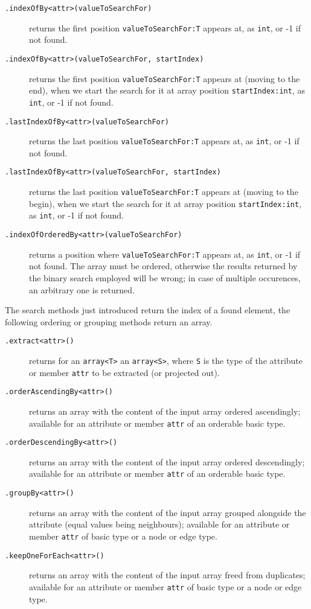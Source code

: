 \begin{description}
\item[\texttt{.indexOfBy<attr>(valueToSearchFor)}] returns the first position \texttt{valueToSearchFor:T} appears at, as \texttt{int}, or -1 if not found.
\item[\texttt{.indexOfBy<attr>(valueToSearchFor, startIndex)}] returns the first position \texttt{valueToSearchFor:T} appears at (moving to the end), when we start the search for it at array position \texttt{startIndex:int}, as \texttt{int}, or -1 if not found.
\item[\texttt{.lastIndexOfBy<attr>(valueToSearchFor)}] returns the last position \texttt{valueToSearchFor:T} appears at, as \texttt{int}, or -1 if not found.
\item[\texttt{.lastIndexOfBy<attr>(valueToSearchFor, startIndex)}] returns the last position \texttt{valueToSearchFor:T} appears at (moving to the begin), when we start the search for it at array position \texttt{startIndex:int}, as \texttt{int}, or -1 if not found.
\item[\texttt{.indexOfOrderedBy<attr>(valueToSearchFor)}] returns a position where \texttt{valueToSearchFor:T} appears at, as \texttt{int}, or -1 if not found. The array must be ordered, otherwise the results returned by the binary search employed will be wrong; in case of multiple occurences, an arbitrary one is returned.
\end{description}

\noindent The search methods just introduced return the index of a found element, the following ordering or grouping methods return an array.

\begin{description}
\item[\texttt{.extract<attr>()}] returns for an \texttt{array<T>} an \texttt{array<S>}, where \texttt{S} is the type of the attribute or member \texttt{attr} to be extracted (or projected out).
\item[\texttt{.orderAscendingBy<attr>()}] returns an array with the content of the input array ordered ascendingly; available for an attribute or member \texttt{attr} of an orderable basic type.
\item[\texttt{.orderDescendingBy<attr>()}] returns an array with the content of the input array ordered descendingly; available for an attribute or member \texttt{attr} of an orderable basic type.
\item[\texttt{.groupBy<attr>()}] returns an array with the content of the input array grouped alongside the attribute (equal values being neighbours); available for an attribute or member \texttt{attr} of basic type or a node or edge type.
\item[\texttt{.keepOneForEach<attr>()}] returns an array with the content of the input array freed from duplicates; available for an attribute or member \texttt{attr} of basic type or a node or edge type.
\end{description}\label{arraybymemberaccessmethod}

